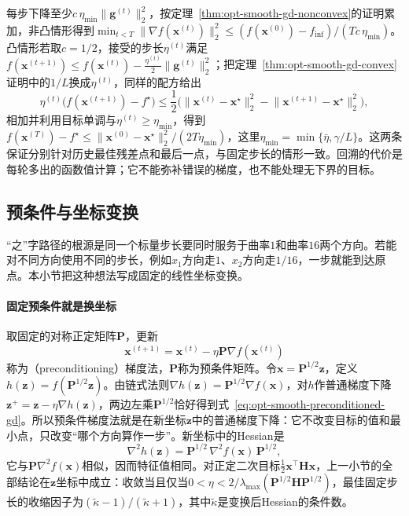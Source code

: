 每步下降至少$c\,\eta_{\min}\lVert\bm g^{(t)}\rVert_2^2$，按定理~\ref{thm:opt-smooth-gd-nonconvex}的证明累加，非凸情形得到$\min_{t<T}\lVert\nabla f(\bm x^{(t)})\rVert_2^2\leq(f(\bm x^{(0)})-f_{\inf})/(Tc\,\eta_{\min})$。凸情形若取$c=1/2$，接受的步长$\eta^{(t)}$满足$f(\bm x^{(t+1)})\leq f(\bm x^{(t)})-\tfrac{\eta^{(t)}}2\lVert\bm g^{(t)}\rVert_2^2$；把定理~\ref{thm:opt-smooth-gd-convex}证明中的$1/L$换成$\eta^{(t)}$，同样的配方给出
\[
  \eta^{(t)}\bigl(f(\bm x^{(t+1)})-f^\star\bigr)\leq\frac12\bigl(\lVert\bm x^{(t)}-\bm x^\star\rVert_2^2-\lVert\bm x^{(t+1)}-\bm x^\star\rVert_2^2\bigr),
\]
相加并利用目标单调与$\eta^{(t)}\geq\eta_{\min}$，得到$f(\bm x^{(T)})-f^\star\leq\lVert\bm x^{(0)}-\bm x^\star\rVert_2^2/(2T\eta_{\min})$，这里$\eta_{\min}=\min\{\bar\eta,\gamma/L\}$。这两条保证分别针对历史最佳残差点和最后一点，与固定步长的情形一致。回溯的代价是每轮多出的函数值计算；它不能弥补错误的梯度，也不能处理无下界的目标。

\subsection{预条件与坐标变换}
\label{sec:opt-smooth-preconditioning}

“之”字路径的根源是同一个标量步长要同时服务于曲率$1$和曲率$16$两个方向。若能对不同方向使用不同的步长，例如$x_1$方向走$1$、$x_2$方向走$1/16$，一步就能到达原点。本小节把这种想法写成固定的线性坐标变换。

\paragraph{固定预条件就是换坐标}
取固定的对称正定矩阵$\bm P$，更新
\begin{equation}
\label{eq:opt-smooth-preconditioned-gd}
  \bm x^{(t+1)}=\bm x^{(t)}-\eta\bm P\nabla f(\bm x^{(t)})
\end{equation}
称为（preconditioning）梯度法，$\bm P$称为预条件矩阵。令$\bm x=\bm P^{1/2}\bm z$，定义$h(\bm z)=f(\bm P^{1/2}\bm z)$。由链式法则$\nabla h(\bm z)=\bm P^{1/2}\nabla f(\bm x)$，对$h$作普通梯度下降$\bm z^+=\bm z-\eta\nabla h(\bm z)$，两边左乘$\bm P^{1/2}$恰好得到式~\eqref{eq:opt-smooth-preconditioned-gd}。所以预条件梯度法就是在新坐标$\bm z$中的普通梯度下降：它不改变目标的值和最小点，只改变“哪个方向算作一步”。新坐标中的Hessian是
\[
  \nabla^2h(\bm z)=\bm P^{1/2}\,\nabla^2f(\bm x)\,\bm P^{1/2},
\]
它与$\bm P\nabla^2f(\bm x)$相似，因而特征值相同。对正定二次目标$\tfrac12\bm x^\top\bm H\bm x$，上一小节的全部结论在$\bm z$坐标中成立：收敛当且仅当$0<\eta<2/\lambda_{\max}(\bm P^{1/2}\bm H\bm P^{1/2})$，最佳固定步长的收缩因子为$(\tilde\kappa-1)/(\tilde\kappa+1)$，其中$\tilde\kappa$是变换后Hessian的条件数。

